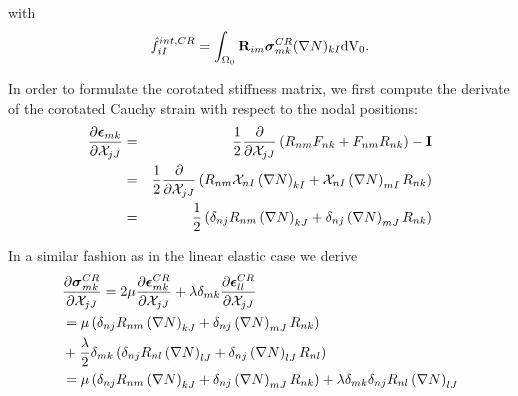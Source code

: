with
\begin{eqnarray}
\hat{f} ^{int,CR}_{iI}  =   \int _{\Omega _0}  \mathbf{R}_{im} \boldsymbol{\sigma}^{CR}_{mk}  (\nabla N)_{kI}  \textnormal{dV}_0.
\end{eqnarray}

In order to formulate the corotated stiffness matrix, we first compute the derivate of the corotated Cauchy strain with respect to the nodal positions:
\begin{eqnarray}
\frac{\partial \boldsymbol{\epsilon} _{mk}}{\partial \mathcal{X}  _{jJ}} &=& \frac{1}{2} \frac{\partial}{\partial \mathcal{X}  _{jJ}} \left(R_{nm} F_{nk} + F_{nm} R_{nk}  \right) -  \mathbf {I } \notag \\
&=& \frac{1}{2} \frac{\partial}{\partial \mathcal{X}  _{jJ}} \left(R_{nm} \mathcal{X} _{nI} \left( \nabla N \right)_{kI}  + \mathcal{X} _{nI} \left( \nabla N \right)_{mI} R_{nk}  \right) \notag \\
&=& \frac{1}{2}  \left( \delta_{nj} R_{nm}  \left( \nabla N \right)_{kJ}  + \delta_{nj}\left( \nabla N \right)_{mJ} R_{nk}  \right) 
\end{eqnarray}

In a similar fashion as in the linear elastic case we derive
\begin{alignat}{1}
& \frac{\partial \boldsymbol{\sigma}^{CR} _{mk}}{\partial \mathcal{X}  _{jJ}} = 2\mu \frac{\partial \boldsymbol{\epsilon}^{CR}_{mk}}{\partial \mathcal{X}  _{jJ}} + \lambda \delta _{mk} \frac{\partial \boldsymbol{\epsilon}^{CR}_{ll}}{\partial \mathcal{X}  _{jJ}} \notag \\
&= \mu \left(  \delta_{nj} R_{nm}  \left( \nabla N \right)_{kJ}  + \delta_{nj}\left( \nabla N \right)_{mJ} R_{nk}  \right) \notag \\
& + \frac{\lambda}{2}  \delta _{mk} \left( \delta_{nj} R_{nl}  \left( \nabla N \right)_{lJ}  + \delta_{nj}\left( \nabla N \right)_{lJ} R_{nl}  \right)  \notag \\
&= \mu \left(  \delta_{nj} R_{nm}  \left( \nabla N \right)_{kJ}  + \delta_{nj}\left( \nabla N \right)_{mJ} R_{nk}  \right) + \lambda  \delta _{mk}  \delta_{nj} R_{nl}  \left( \nabla N \right)_{lJ}
\end{alignat}

